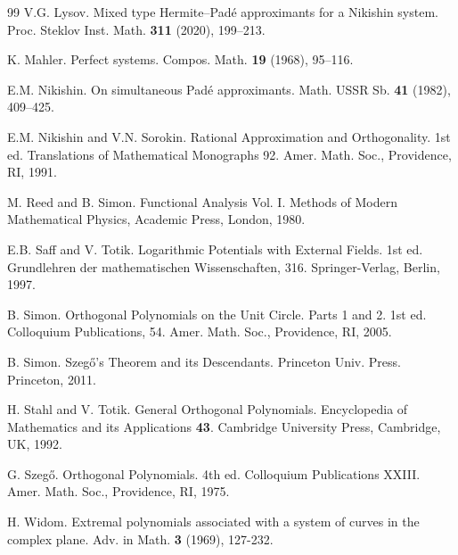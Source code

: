 \documentclass{amsart}
\numberwithin{equation}{section}
\theoremstyle{definition}
\begin{document}
\begin{thebibliography}{99}
     V.G. Lysov. Mixed type Hermite–Padé approximants for a Nikishin system. {Proc. Steklov Inst. Math.} \textbf{311} (2020), 199--213. %

     K. Mahler. Perfect systems. {Compos. Math.} \textbf{19} (1968), 95--116. %


     E.M. Nikishin. On simultaneous Padé approximants. {Math. USSR Sb.} \textbf{41} (1982), 409--425. %

     E.M. Nikishin and V.N. Sorokin.  {Rational Approximation and Orthogonality}. 1st ed. Translations of Mathematical Monographs 92. Amer. Math. Soc., Providence, RI, 1991.

     M. Reed and B. Simon. Functional Analysis  Vol. I. Methods of Modern Mathematical Physics, Academic Press, London, 1980.

  E.B. Saff and V. Totik. {Logarithmic Potentials with External Fields}. 1st ed. Grundlehren der mathematischen Wissenschaften, 316. Springer-Verlag, Berlin, 1997.

     B. Simon.  {Orthogonal Polynomials on the Unit Circle. Parts 1 and 2}. 1st ed. Colloquium Publications, 54. Amer. Math. Soc., Providence, RI, 2005.

     B. Simon.  {Szeg\H{o}'s Theorem and its Descendants.} Princeton Univ. Press. Princeton, 2011.


     H. Stahl and V. Totik.  General Orthogonal Polynomials. Encyclopedia of Mathematics and its Applications \textbf{43}. Cambridge University Press, Cambridge, UK, 1992.

     G. Szeg\H{o}.  {Orthogonal Polynomials}. 4th ed. Colloquium Publications XXIII. Amer. Math. Soc., Providence, RI, 1975.

     H. Widom. Extremal polynomials associated with a system of curves in the complex plane. Adv. in Math. \textbf{3} (1969), 127-232.
\end{thebibliography}
\end{document}

